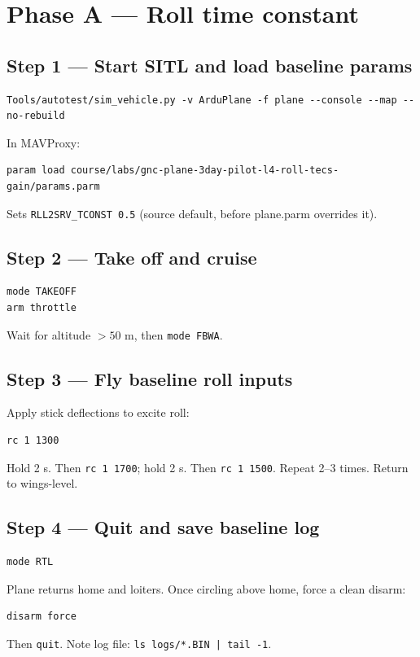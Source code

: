 \documentclass[a4paper,11pt,twoside]{article}
\begin{document}
\section*{Phase A --- Roll time constant}

\subsection*{Step 1 --- Start SITL and load baseline params}
\begin{Verbatim}[frame=single,fontsize=\small]
Tools/autotest/sim_vehicle.py -v ArduPlane -f plane --console --map --no-rebuild
\end{Verbatim}
In MAVProxy:
\begin{Verbatim}[frame=single,fontsize=\small]
param load course/labs/gnc-plane-3day-pilot-l4-roll-tecs-gain/params.parm
\end{Verbatim}
Sets \texttt{RLL2SRV\_TCONST 0.5} (source default, before plane.parm overrides it).

\subsection*{Step 2 --- Take off and cruise}
\begin{Verbatim}[frame=single,fontsize=\small]
mode TAKEOFF
arm throttle
\end{Verbatim}
Wait for altitude $> 50$ m, then \texttt{mode FBWA}.

\subsection*{Step 3 --- Fly baseline roll inputs}
Apply stick deflections to excite roll:
\begin{Verbatim}[frame=single,fontsize=\small]
rc 1 1300
\end{Verbatim}
Hold 2 s. Then \texttt{rc 1 1700}; hold 2 s. Then \texttt{rc 1 1500}. Repeat 2--3 times. Return to wings-level.

\subsection*{Step 4 --- Quit and save baseline log}
\begin{Verbatim}[frame=single,fontsize=\small]
mode RTL
\end{Verbatim}
Plane returns home and loiters. Once circling above home, force a clean disarm:
\begin{Verbatim}[frame=single,fontsize=\small]
disarm force
\end{Verbatim}
Then \texttt{quit}. Note log file: \texttt{ls logs/*.BIN | tail -1}.
\end{document}
